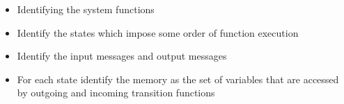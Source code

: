 \begin{itemize}
\item Identifying the system functions
\item Identify the states which impose some order of function execution
\item Identify the input messages and output messages
\item For each state identify the memory as the set of variables that are accessed by outgoing and incoming transition functions
\end{itemize}
